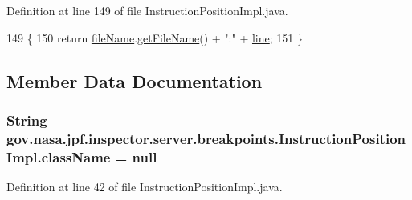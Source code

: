 Definition at line 149 of file Instruction\+Position\+Impl.\+java.


\begin{DoxyCode}
149                             \{
150     \textcolor{keywordflow}{return} \hyperlink{classgov_1_1nasa_1_1jpf_1_1inspector_1_1server_1_1breakpoints_1_1_instruction_position_impl_a516c1bf9f9237fa2da514022d0ed4679}{fileName}.\hyperlink{classgov_1_1nasa_1_1jpf_1_1inspector_1_1utils_1_1expressions_1_1_file_name_aa6173a74277aa2e86a209d3118203fa8}{getFileName}() + \textcolor{stringliteral}{":"} + \hyperlink{classgov_1_1nasa_1_1jpf_1_1inspector_1_1server_1_1breakpoints_1_1_instruction_position_impl_ab362ce71d6d351401c64199096a5a75c}{line};
151   \}
\end{DoxyCode}


\subsection{Member Data Documentation}
\subsubsection[{\texorpdfstring{class\+Name}{className}}]{\setlength{\rightskip}{0pt plus 5cm}String gov.\+nasa.\+jpf.\+inspector.\+server.\+breakpoints.\+Instruction\+Position\+Impl.\+class\+Name = null\hspace{0.3cm}{\ttfamily [private]}}\hypertarget{classgov_1_1nasa_1_1jpf_1_1inspector_1_1server_1_1breakpoints_1_1_instruction_position_impl_af1da872ffe98d641617964bdc2edc7eb}{}\label{classgov_1_1nasa_1_1jpf_1_1inspector_1_1server_1_1breakpoints_1_1_instruction_position_impl_af1da872ffe98d641617964bdc2edc7eb}


Definition at line 42 of file Instruction\+Position\+Impl.\+java.

